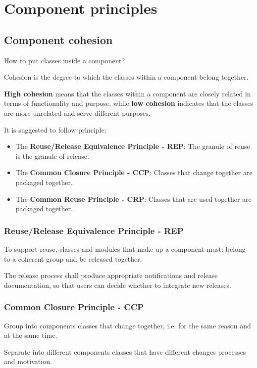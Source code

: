 \section{Component principles}

\subsection{Component cohesion}

How to put classes inside a component?

Cohesion is the degree to which the
classes within a component belong together.

\textbf{High cohesion} means that the
classes within a component are closely related in terms of functionality
and purpose, while \textbf{low cohesion} indicates that the classes are more unrelated
and serve different purposes.


It is suggested to follow principle:

\begin{itemize}
  \item The \textbf{Reuse/Release Equivalence Principle - REP}: The granule of reuse is the granule of release.
  \item The \textbf{Common Closure Principle - CCP}: Classes that change together are packaged together.
  \item The \textbf{Common Reuse Principle - CRP}: Classes that are used together are packaged together.
\end{itemize}

\subsubsection{Reuse/Release Equivalence Principle - REP}
To support reuse, classes and modules that make up a component
must: belong to a coherent group and be released together.

The release process shall produce appropriate notifications and release
documentation, so that users can decide whether to integrate new releases.


\subsubsection{Common Closure Principle - CCP}
Group into components classes that change together, i.e. for the same
reason and at the same time.


Separate into different components classes that have different
changes processes and motivation.


